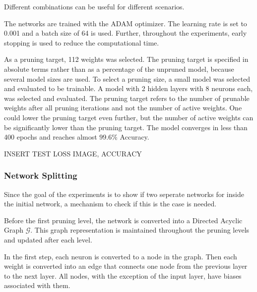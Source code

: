 Different combinations can be useful for different scenarios.

The networks are trained with the ADAM optimizer.
The learning rate is set to 0.001 and a batch size of 64 is used.
Further, throughout the experiments, early stopping is used to reduce the computational time.

As a pruning target, 112 weights was selected.
The pruning target is specified in absolute terms rather than as a percentage of the unpruned model, because several model sizes are used.
To select a pruning size, a small model was selected and evaluated to be trainable.
A model with 2 hidden layers with 8 neurons each, was selected and evaluated.
The pruning target refers to the number of prunable weights after all pruning iterations and not the number of active weights.
One could lower the pruning target even further, but the number of active weights can be significantly lower than the pruning target.
The model converges in less than 400 epochs and reaches almost $99.6$\% Accuracy.

INSERT TEST LOSS IMAGE, ACCURACY


\subsubsection{Network Splitting}
Since the goal of the experiments is to show if two seperate networks for inside the initial network, a mechanism to check if this is the case is needed.

Before the first pruning level, the network is converted into a Directed Acyclic Graph $\mathcal{G}$.
This graph representation is maintained throughout the pruning levels and updated after each level.

In the first step, each neuron is converted to a node in the graph.
Then each weight is converted into an edge that connects one node from the previous layer to the next layer.
All nodes, with the exception of the input layer, have biases associated with them.

